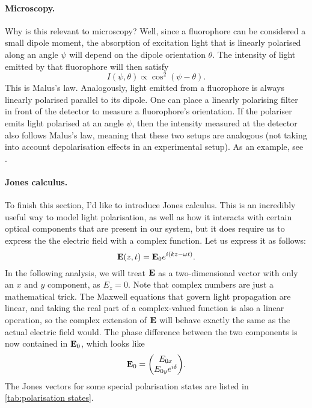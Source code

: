 \paragraph{Microscopy.} Why is this relevant to microscopy? Well, since a fluorophore can be considered a small dipole moment, the absorption of excitation light that is linearly polarised along an angle $ \psi $ will depend on the dipole orientation $ \theta $. The intensity of light emitted by that fluorophore will then satisfy 
\begin{equation}
	\label{eq:malus}
	I(\psi, \theta) \propto \cos^2(\psi-\theta).
\end{equation}
This is Malus's law. Analogously, light emitted from a fluorophore is always linearly polarised parallel to its dipole. One can place a linearly polarising filter in front of the detector to measure a fluorophore's orientation. If the polariser emits light polarised at an angle $ \psi $, then the intensity measured at the detector also follows Malus's law, meaning that these two setups are analogous (not taking into account depolarisation effects in an experimental setup). As an example, see .

\paragraph{Jones calculus.} To finish this section, I'd like to introduce Jones calculus. This is an incredibly useful way to model light polarisation, as well as how it interacts with certain optical components that are present in our system, but it does require us to express the the electric field with a complex function. Let us express it as follows:
\begin{equation}
	\vb{E}(z, t) = \vb{E}_0 e^{i(kz-\omega t)}.
	\label{eq:propagator}
\end{equation}
In the following analysis, we will treat $ \vb{E} $ as a two-dimensional vector with only an $ x $ and $ y $ component, as $ E_z = 0 $. Note that complex numbers are just a mathematical trick. The Maxwell equations that govern light propagation are linear, and taking the real part of a complex-valued function is also a linear operation, so the complex extension of $ \vb{E} $ will behave exactly the same as the actual electric field would. The phase difference between the two components is now contained in $ \vb{E}_0 $, which looks like
\begin{equation}
	\vb{E}_0 = \mqty(\Eox \\ \Eoy e^{i\delta} ).
\end{equation}
The Jones vectors for some special polarisation states are listed in \autoref{tab:polarisation states}.

